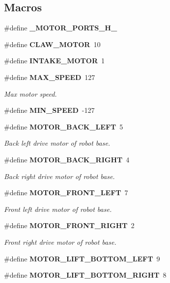 \subsection*{Macros}
\begin{DoxyCompactItemize}
\item 
\#define \textbf{ \+\_\+\+M\+O\+T\+O\+R\+\_\+\+P\+O\+R\+T\+S\+\_\+\+H\+\_\+}
\item 
\#define \textbf{ C\+L\+A\+W\+\_\+\+M\+O\+T\+OR}~10
\item 
\#define \textbf{ I\+N\+T\+A\+K\+E\+\_\+\+M\+O\+T\+OR}~1
\item 
\#define \textbf{ M\+A\+X\+\_\+\+S\+P\+E\+ED}~127
\begin{DoxyCompactList}\small\item\em Max motor speed. \end{DoxyCompactList}\item 
\#define \textbf{ M\+I\+N\+\_\+\+S\+P\+E\+ED}~-\/127
\item 
\#define \textbf{ M\+O\+T\+O\+R\+\_\+\+B\+A\+C\+K\+\_\+\+L\+E\+FT}~5
\begin{DoxyCompactList}\small\item\em Back left drive motor of robot base. \end{DoxyCompactList}\item 
\#define \textbf{ M\+O\+T\+O\+R\+\_\+\+B\+A\+C\+K\+\_\+\+R\+I\+G\+HT}~4
\begin{DoxyCompactList}\small\item\em Back right drive motor of robot base. \end{DoxyCompactList}\item 
\#define \textbf{ M\+O\+T\+O\+R\+\_\+\+F\+R\+O\+N\+T\+\_\+\+L\+E\+FT}~7
\begin{DoxyCompactList}\small\item\em Front left drive motor of robot base. \end{DoxyCompactList}\item 
\#define \textbf{ M\+O\+T\+O\+R\+\_\+\+F\+R\+O\+N\+T\+\_\+\+R\+I\+G\+HT}~2
\begin{DoxyCompactList}\small\item\em Front right drive motor of robot base. \end{DoxyCompactList}\item 
\#define \textbf{ M\+O\+T\+O\+R\+\_\+\+L\+I\+F\+T\+\_\+\+B\+O\+T\+T\+O\+M\+\_\+\+L\+E\+FT}~9
\item 
\#define \textbf{ M\+O\+T\+O\+R\+\_\+\+L\+I\+F\+T\+\_\+\+B\+O\+T\+T\+O\+M\+\_\+\+R\+I\+G\+HT}~8
\item 

\end{DoxyCompactItemize}
